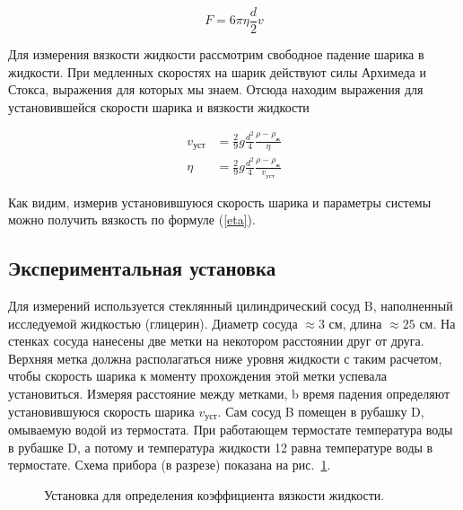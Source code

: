 \documentclass[a4paper]{article}
\begin{document}
    \begin{equation}\label{stokes}
        F = 6\pi\eta \frac{d}{2}v
    \end{equation}


    Для измерения вязкости жидкости рассмотрим свободное падение шарика в жидкости. При медленных скоростях на шарик действуют силы Архимеда и Стокса, выражения для которых мы знаем. Отсюда находим выражения для установившейся скорости шарика и вязкости жидкости

    \begin{align}
        v_{уст}&=\frac{2}{9}g\frac{d^2}{4}\frac{\rho - \rho_ж}{\eta}\label{v_ust}\\
        \eta&=\frac{2}{9}g\frac{d^2}{4}\frac{\rho - \rho_ж}{v_{уст}}\label{eta}
    \end{align}

    Как видим, измерив установившуюся скорость шарика и параметры системы можно получить вязкость по формуле (\ref{eta}).

    \subsection{Экспериментальная установка}
    Для измерений используется стеклянный цилиндрический сосуд B, наполненный исследуемой жидкостью (глицерин). Диаметр сосуда $\approx 3$ см, длина $\approx 25$ см. На стенках сосуда нанесены две метки на некотором расстоянии друг от друга. Верхняя метка должна располагаться ниже уровня жидкости с таким расчетом, чтобы скорость шарика к моменту прохождения этой метки успевала установиться. Измеряя расстояние между метками, b время падения определяют установившуюся скорость шарика $v_{уст}$. Сам сосуд B помещен в рубашку D, омываемую водой из термостата. При работающем термостате температура воды в рубашке D, а потому и температура жидкости 12 равна температуре воды в термостате.
    Схема прибора (в разрезе) показана на рис.~\ref{ustanovka}.
    \begin{figure}[ht]
        \caption{Установка для определения коэффициента вязкости жидкости.}
        \label{ustanovka}
    \end{figure}
\end{document}
